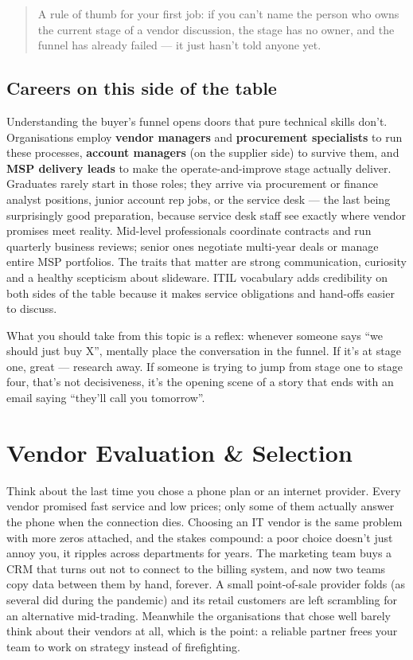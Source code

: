 \begin{quote}\small
A rule of thumb for your first job: if you can't name the person who owns the current stage of a vendor discussion, the stage has no owner, and the funnel has already failed — it just hasn't told anyone yet.
\end{quote}



\subsection{Careers on this side of the table}


Understanding the buyer's funnel opens doors that pure technical skills don't. Organisations employ \textbf{vendor managers} and \textbf{procurement specialists} to run these processes, \textbf{account managers} (on the supplier side) to survive them, and \textbf{MSP delivery leads} to make the operate-and-improve stage actually deliver. Graduates rarely start in those roles; they arrive via procurement or finance analyst positions, junior account rep jobs, or the service desk — the last being surprisingly good preparation, because service desk staff see exactly where vendor promises meet reality. Mid-level professionals coordinate contracts and run quarterly business reviews; senior ones negotiate multi-year deals or manage entire MSP portfolios. The traits that matter are strong communication, curiosity and a healthy scepticism about slideware. ITIL vocabulary adds credibility on both sides of the table because it makes service obligations and hand-offs easier to discuss.


What you should take from this topic is a reflex: whenever someone says ``we should just buy X'', mentally place the conversation in the funnel. If it's at stage one, great — research away. If someone is trying to jump from stage one to stage four, that's not decisiveness, it's the opening scene of a story that ends with an email saying ``they'll call you tomorrow''.

\section{Vendor Evaluation \& Selection}
Think about the last time you chose a phone plan or an internet provider. Every vendor promised fast service and low prices; only some of them actually answer the phone when the connection dies. Choosing an IT vendor is the same problem with more zeros attached, and the stakes compound: a poor choice doesn't just annoy you, it ripples across departments for years. The marketing team buys a CRM that turns out not to connect to the billing system, and now two teams copy data between them by hand, forever. A small point-of-sale provider folds (as several did during the pandemic) and its retail customers are left scrambling for an alternative mid-trading. Meanwhile the organisations that chose well barely think about their vendors at all, which is the point: a reliable partner frees your team to work on strategy instead of firefighting.


